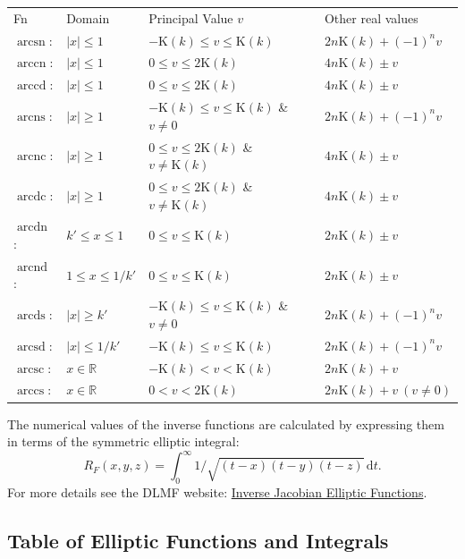 \begin{tabular}{llll}
  Fn & Domain & Principal Value $v$ & Other real values\\
$\mathop{\mathrm{arcsn}}$: & $ |x| \le 1 $ &
  $-\mathrm{K}(k) \le v \le \mathrm{K}(k)$ &
  $2 n\mathrm{K}(k)+(-1)^nv$ \\
$\mathop{\mathrm{arccn}}$: &  $ |x| \le 1 $ &
  $0 \le v \le 2\mathrm{K}(k)$ &
  $4 n\mathrm{K}(k) \pm v$ \\
$\mathop{\mathrm{arccd}}$: & $ |x| \le 1 $ &
  $0 \le v \le 2\mathrm{K}(k)$ &
  $4 n\mathrm{K}(k) \pm v$ \\
$\mathop{\mathrm{arcns}}$: & $ |x| \ge 1 $ &
  $-\mathrm{K}(k) \le v \le \mathrm{K}(k)$ \& $v \neq 0$ &
  $2 n\mathrm{K}(k)+(-1)^nv$ \\
$\mathop{\mathrm{arcnc}}$: & $ |x| \ge 1 $ &
  $0 \le v \le 2\mathrm{K}(k)$ \& $v \neq \mathrm{K}(k)$  &
  $4 n\mathrm{K}(k) \pm v$ \\
$\mathop{\mathrm{arcdc}}$: & $ |x| \ge 1 $ &
  $0 \le v \le 2\mathrm{K}(k)$ \& $v \neq \mathrm{K}(k)$ &
  $4 n\mathrm{K}(k) \pm v$ \\
$\mathop{\mathrm{arcdn}}$: & $ k' \le x \le 1$ &
  $0 \le v \le \mathrm{K}(k)$ &
  $2 n\mathrm{K}(k) \pm v$ \\
$\mathop{\mathrm{arcnd}}$: & $ 1 \le x \le 1/k'$ &
  $0 \le v \le \mathrm{K}(k)$ &
  $2 n\mathrm{K}(k) \pm v$ \\
$\mathop{\mathrm{arcds}}$: & $ |x| \ge k'$ &
  $-\mathrm{K}(k) \le v \le \mathrm{K}(k)$ \& $v \neq 0$ &
  $2 n\mathrm{K}(k)+(-1)^nv $ \\
$\mathop{\mathrm{arcsd}}$: & $  |x| \le 1/k'$ &
  $-\mathrm{K}(k) \le v \le \mathrm{K}(k)$ &
  $2 n\mathrm{K}(k)+(-1)^nv $ \\
$\mathop{\mathrm{arcsc}}$: & $ x \in \mathbb{R}$ &
  $-\mathrm{K}(k) < v < \mathrm{K}(k)$ &
  $2 n\mathrm{K}(k) + v$ \\
$\mathop{\mathrm{arccs}}$: & $ x \in \mathbb{R}$ &
$0 < v < 2\mathrm{K}(k)$  &
  $2 n\mathrm{K}(k) + v\ (v \neq 0)$ \\
\end{tabular}

The numerical values of the inverse functions are calculated by
expressing them in terms of the symmetric elliptic integral:
\[ R_F(x,y,z)=\int_0^\infty 1/\sqrt{(t-x)(t-y)(t-z)}\,\mathrm{d}t. \]
For more details see the DLMF website:
\href{https://dlmf.nist.gov/19.25#v}{Inverse Jacobian
Elliptic Functions}.

\subsection{Table of Elliptic Functions and Integrals}
\hypertarget{ELLIPFNTAB}{}

